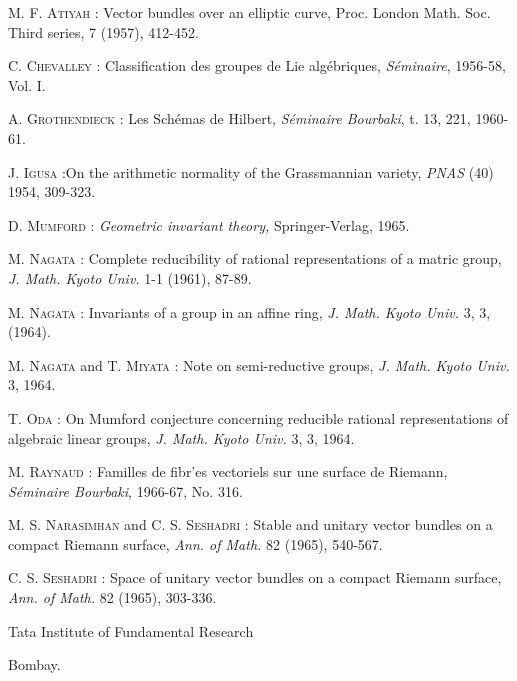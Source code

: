 \begin{thebibliography}{99}
 \textsc{M. F. Atiyah :} Vector bundles over an elliptic curve, {\rm Proc. London Math. Soc.} Third series, 7 (1957), 412-452.

 \textsc{C. Chevalley :} Classification des groupes de Lie alg\'ebriques, {\em S\'eminaire}, 1956-58, Vol. I.

 \textsc{A. Grothendieck :} Les Sch\'emas de Hilbert, {\em S\'eminaire Bourbaki}, t. 13, 221, 1960-61.

 \textsc{J. Igusa :}\pageoriginale On the arithmetic normality of the Grassmannian variety, {\em PNAS} (40) 1954, 309-323.

 \textsc{D. Mumford :} {\em Geometric invariant theory,} Springer-Verlag, 1965.

 \textsc{M. Nagata :} Complete reducibility of rational representations of a matric group, {\em J. Math. Kyoto Univ.} 1-1 (1961), 87-89.

 \textsc{M. Nagata :} Invariants of a group in an affine ring, {\em J. Math. Kyoto Univ.} 3, 3, (1964).

 \textsc{M. Nagata} and \textsc{T. Miyata :} Note on semi-reductive groups, {\em J. Math. Kyoto Univ.} 3, 1964.

 \textsc{T. Oda :} On Mumford conjecture concerning reducible rational representations of algebraic linear groups, {\em J. Math. Kyoto Univ.} 3, 3, 1964.

 \textsc{M. Raynaud :} Familles de fibr'es vectoriels sur une surface de Riemann, {\em S\'eminaire Bourbaki}, 1966-67, No. 316.

 \textsc{M. S. Narasimhan} and \textsc{C. S. Seshadri :} Stable and unitary vector bundles on a compact Riemann surface, {\em Ann. of Math.} 82 (1965), 540-567.

 \textsc{C. S. Seshadri :} Space of unitary vector bundles on a compact Riemann surface, {\em Ann. of Math.} 82 (1965), 303-336.
\end{thebibliography}

\bigskip
\noindent
{\small Tata Institute of Fundamental Research}

\noindent
{\small Bombay.}

